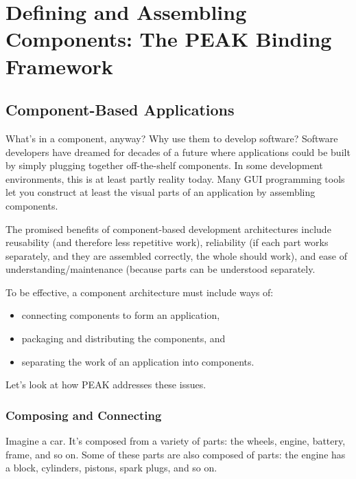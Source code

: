 \chapter{Defining and Assembling Components: The PEAK Binding Framework}

\section{Component-Based Applications}

What's in a component, anyway?  Why use them to develop software?  Software
developers have dreamed for decades of a future where applications could be
built by simply plugging together off-the-shelf components.  In some
development environments, this is at least partly reality today.  Many GUI
programming tools let you construct at least the visual parts of an 
application by assembling components.

The promised benefits of component-based development architectures include
reusability (and therefore less repetitive work), reliability (if each part
works separately, and they are assembled correctly, the whole should work),
and ease of understanding/maintenance (because parts can be understood
separately.

To be effective, a component architecture must include ways of:

\begin{itemize}

\item connecting components to form an application,

\item packaging and distributing the components, and

\item separating the work of an application into components.

\end{itemize}

Let's look at how PEAK addresses these issues.


\subsection{Composing and Connecting}

Imagine a car.  It's composed from a variety of parts: the wheels, engine, 
battery, frame, and so on.  Some of these parts are also composed of parts:
the engine has a block, cylinders, pistons, spark plugs, and so on.


